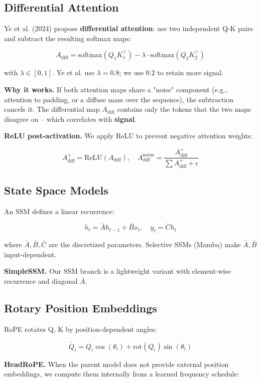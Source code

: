 \subsection{Differential Attention}

Ye et al. (2024) propose \textbf{differential attention}: use two independent 
Q-K pairs and subtract the resulting softmax maps:

\[
A_\text{diff} = \text{softmax}(Q_1 K_1^\top) - \lambda \cdot \text{softmax}(Q_2 K_2^\top)
\tag{3.3}
\]

with $\lambda \in [0, 1]$. Ye et al. use $\lambda = 0.8$; we use $0.2$ to 
retain more signal.

\textbf{Why it works.} If both attention maps share a "noise" component (e.g., 
attention to padding, or a diffuse mass over the sequence), the subtraction 
cancels it. The differential map $A_\text{diff}$ contains only the tokens 
that the two maps disagree on -- which correlates with \textbf{signal}.

\textbf{ReLU post-activation.} We apply ReLU to prevent negative attention 
weights:

\[
A_\text{diff}^+ = \text{ReLU}(A_\text{diff}), \quad
A_\text{diff}^\text{norm} = \frac{A_\text{diff}^+}{\sum A_\text{diff}^+ + \epsilon}
\tag{3.4}
\]

\subsection{State Space Models}

An SSM defines a linear recurrence:

\[
h_t = \bar{A} h_{t-1} + \bar{B} x_t, \quad
y_t = \bar{C} h_t
\tag{3.5}
\]

where $\bar{A}, \bar{B}, \bar{C}$ are the discretized parameters. Selective 
SSMs (Mamba) make $\bar{A}, \bar{B}$ input-dependent.

\textbf{SimpleSSM.} Our SSM branch is a lightweight variant with element-wise 
recurrence and diagonal $\bar{A}$.

\subsection{Rotary Position Embeddings}

RoPE rotates Q, K by position-dependent angles:

\[
\tilde{Q}_i = Q_i \cos(\theta_i) + \text{rot}(Q_i) \sin(\theta_i)
\tag{3.6}
\]

\textbf{HeadRoPE.} When the parent model does not provide external position 
embeddings, we compute them internally from a learned frequency schedule:

